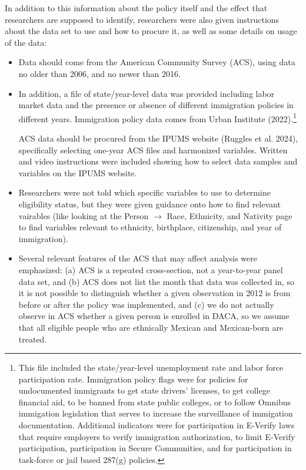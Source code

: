 \documentclass[
  letterpaper,
  DIV=11,
  numbers=noendperiod]{scrartcl}
\begin{document}
In addition to this information about the policy itself and the effect
that researchers are supposed to identify, researchers were also given
instructions about the data set to use and how to procure it, as well as
some details on usage of the data:

\begin{itemize}
\item
  Data should come from the American Community Survey (ACS), using data
  no older than 2006, and no newer than 2016.
\item
  In addition, a file of state/year-level data was provided including
  labor market data and the presence or absence of different immigration
  policies in different years. Immigration policy data comes from Urban
  Institute (2022).\footnote{This file included the state/year-level
    unemployment rate and labor force participation rate. Immigration
    policy flags were for policies for undocumented immigrants to get
    state drivers' licenses, to get college financial aid, to be banned
    from state public colleges, or to follow Omnibus immigation
    legislation that serves to increase the surveillance of immigation
    documentation. Additional indicators were for participation in
    E-Verify laws that require employers to verify immigration
    authorization, to limit E-Verify participation, participation in
    Secure Communities, and for participation in task-force or jail
    based 287(g) policies.}

  ACS data should be procured from the IPUMS website (Ruggles et al.
  2024), specifically selecting one-year ACS files and harmonized
  variables. Written and video instructions were included showing how to
  select data samples and variables on the IPUMS website.
\item
  Researchers were not told which specific variables to use to determine
  eligibility status, but they were given guidance onto how to find
  relevant vairables (like looking at the Person \(\rightarrow\) Race,
  Ethnicity, and Nativity page to find variables relevant to ethnicity,
  birthplace, citizenship, and year of immigration).
\item
  Several relevant features of the ACS that may affect analysis were
  emphasized: (a) ACS is a repeated cross-section, not a year-to-year
  panel data set, and (b) ACS does not list the month that data was
  collected in, so it is not possible to distinguish whether a given
  observation in 2012 is from before or after the policy was
  implemented, and (c) we do not actually observe in ACS whether a given
  person is enrolled in DACA, so we assume that all eligible people who
  are ethnically Mexican and Mexican-born are treated.
\end{itemize}
\end{document}
